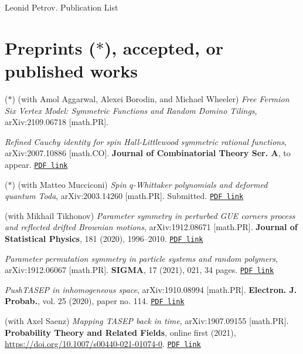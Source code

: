 \documentclass[letterpaper,11pt]{article}
\begin{document}
{\huge Leonid Petrov. Publication List}


\bigskip
\bigskip

\section*{Preprints ($*$), accepted, or published works}

\begin{etaremune}
	\renewcommand{\labelenumi}{[\theenumi]}
	\item ($*$)
	(with Amol Aggarwal, Alexei Borodin, and Michael Wheeler)
	\emph{Free Fermion Six Vertex Model: Symmetric Functions and Random Domino Tilings},
	arXiv:2109.06718 [math.PR].
	\item 
		\emph{Refined Cauchy identity for spin Hall-Littlewood symmetric rational functions},
		arXiv:2007.10886 [math.CO].
		\textbf{Journal of Combinatorial Theory Ser. A}, to appear.
		\href{https://storage.lpetrov.cc/research_files/Petrov-publ/37-publ-petrov-uva.pdf}{\texttt{PDF link}}	
	\item ($*$)
		(with Matteo Mucciconi)
		\emph{Spin $q$-Whittaker polynomials and deformed quantum Toda},
		arXiv:2003.14260 [math.PR]. Submitted.
		\href{https://storage.lpetrov.cc/research_files/Petrov-publ/36-publ-petrov-uva.pdf}{\texttt{PDF link}}	
	\item 
		(with Mikhail Tikhonov)
		\emph{Parameter symmetry in perturbed GUE corners process and reflected drifted Brownian motions},
		arXiv:1912.08671 [math.PR]. 
		\textbf{Journal of Statistical Physics}, 181 (2020), 1996–2010.
		\href{https://storage.lpetrov.cc/research_files/Petrov-publ/35-publ-petrov-uva.pdf}{\texttt{PDF link}}	
	\item 
		\emph{Parameter permutation symmetry in particle systems and random polymers},
		arXiv:1912.06067 [math.PR]. \textbf{SIGMA}, 17 (2021), 021, 34 pages.
		\href{https://storage.lpetrov.cc/research_files/Petrov-publ/34-publ-petrov-uva.pdf}{\texttt{PDF link}}	
	\item
		\emph{PushTASEP in inhomogeneous space},
		arXiv:1910.08994 [math.PR]. \textbf{Electron. J. Probab.}, vol. 25 (2020), paper no. 114.
		\href{https://storage.lpetrov.cc/research_files/Petrov-publ/33-publ-petrov-uva.pdf}{\texttt{PDF link}}	
	\item 
		(with Axel Saenz)
		\emph{Mapping TASEP back in time},
		arXiv:1907.09155 [math.PR].
		\textbf{Probability Theory and Related Fields}, online first (2021), \url{https://doi.org/10.1007/s00440-021-01074-0}.
		\href{https://storage.lpetrov.cc/research_files/Petrov-publ/32-publ-petrov-uva.pdf}{\texttt{PDF link}}	

\end{etaremune}
\end{document}

